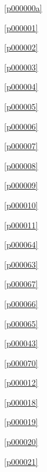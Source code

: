 ﻿



\noindent\figurename\ \ref{p000000a}\dotfill\pageref{p000000a}

\noindent\figurename\ \ref{p000001}\dotfill\pageref{p000001}

\noindent\figurename\ \ref{p000002}\dotfill\pageref{p000002}

\noindent\figurename\ \ref{p000003}\dotfill\pageref{p000003}

\noindent\figurename\ \ref{p000004}\dotfill\pageref{p000004}

\noindent\figurename\ \ref{p000005}\dotfill\pageref{p000005}

\noindent\figurename\ \ref{p000006}\dotfill\pageref{p000006}

\noindent\figurename\ \ref{p000007}\dotfill\pageref{p000007}

\noindent\figurename\ \ref{p000008}\dotfill\pageref{p000008}

\noindent\figurename\ \ref{p000009}\dotfill\pageref{p000009}

\noindent\figurename\ \ref{p000010}\dotfill\pageref{p000010}

\noindent\figurename\ \ref{p000011}\dotfill\pageref{p000011}

\noindent\figurename\ \ref{p000064}\dotfill\pageref{p000064}

\noindent\figurename\ \ref{p000063}\dotfill\pageref{p000063}

\noindent\figurename\ \ref{p000067}\dotfill\pageref{p000067}

\noindent\figurename\ \ref{p000066}\dotfill\pageref{p000066}

\noindent\figurename\ \ref{p000065}\dotfill\pageref{p000065}

\noindent\figurename\ \ref{p000043}\dotfill\pageref{p000043}

\noindent\figurename\ \ref{p000070}\dotfill\pageref{p000070}

\noindent\figurename\ \ref{p000012}\dotfill\pageref{p000012}

\noindent\figurename\ \ref{p000018}\dotfill\pageref{p000018}

\noindent\figurename\ \ref{p000019}\dotfill\pageref{p000019}

\noindent\figurename\ \ref{p000020}\dotfill\pageref{p000020}

\noindent\figurename\ \ref{p000021}\dotfill\pageref{p000021}

